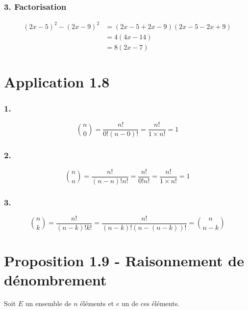 \documentclass{report}
\begin{document}
\subsubsection*{3. Factorisation}

\begin{equation*}
	\begin{split}
		(2x-5)^2 - (2x - 9)^2 &= (2x-5+2x-9)(2x-5-2x+9) \\
		&= 4(4x-14) \\
		&= 8(2x-7)
	\end{split}
\end{equation*}



\section*{Application 1.8}

\subsubsection*{1.}

\begin{displaymath}
	\binom{n}{0}= \frac{n!}{0!(n-0)!}= \frac{n!}{1 \times n!}=1
\end{displaymath}

\subsubsection*{2.}
\begin{displaymath}
	\binom{n}{n}= \frac{n!}{(n-n)!n!}= \frac{n!}{0!n!} = \frac{n!}{1 \times n!}=1
\end{displaymath}


\subsubsection*{3.}
\begin{displaymath}
	\binom{n}{k}= \frac{n!}{(n-k)!k!}= \frac{n!}{(n-k)!(n-(n-k))!}=\binom{n}{n-k}
\end{displaymath}



\section*{Proposition 1.9 - Raisonnement de dénombrement}

Soit $E$ un ensemble de $n$ éléments et $e$ un de ces éléments.
\end{document}
